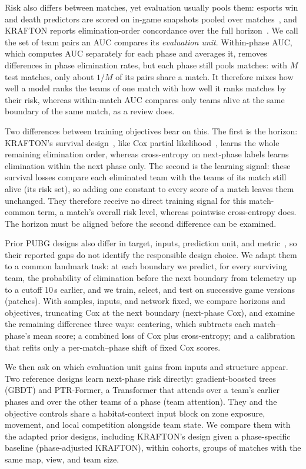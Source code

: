 \documentclass[sigconf,anonymous,nonacm]{acmart}
\begin{document}
Risk also differs between matches, yet evaluation usually pools them: esports win and death predictors are scored on in-game snapshots pooled over matches~\cite{Hodge21,Katona19,Marshall22}, and KRAFTON reports elimination-order concordance over the full horizon~\cite{KRAFTON}. We call the set of team pairs an AUC compares its \emph{evaluation unit}. Within-phase AUC, which computes AUC separately for each phase and averages it, removes differences in phase elimination rates, but each phase still pools matches: with $M$ test matches, only about $1/M$ of its pairs share a match. It therefore mixes how well a model ranks the teams of one match with how well it ranks matches by their risk, whereas within-match AUC compares only teams alive at the same boundary of the same match, as a review does.

Two differences between training objectives bear on this. The first is the horizon: KRAFTON's survival design~\cite{KRAFTON}, like Cox partial likelihood~\cite{Cox72}, learns the whole remaining elimination order, whereas cross-entropy on next-phase labels learns elimination within the next phase only. The second is the learning signal: these survival losses compare each eliminated team with the teams of its match still alive (its risk set), so adding one constant to every score of a match leaves them unchanged. They therefore receive no direct training signal for this match-common term, a match's overall risk level, whereas pointwise cross-entropy does. The horizon must be aligned before the second difference can be examined.

Prior PUBG designs also differ in target, inputs, prediction unit, and metric~\cite{Sagong25a,KRAFTON}, so their reported gaps do not identify the responsible design choice. We adapt them to a common landmark task: at each boundary we predict, for every surviving team, the probability of elimination before the next boundary from telemetry up to a cutoff 10\,s earlier, and we train, select, and test on successive game versions (patches). With samples, inputs, and network fixed, we compare horizons and objectives, truncating Cox at the next boundary (next-phase Cox), and examine the remaining difference three ways: centering, which subtracts each match--phase's mean score; a combined loss of Cox plus cross-entropy; and a calibration that refits only a per-match--phase shift of fixed Cox scores.

We then ask on which evaluation unit gains from inputs and structure appear. Two reference designs learn next-phase risk directly: gradient-boosted trees (GBDT) and PTR-Former, a Transformer that attends over a team's earlier phases and over the other teams of a phase (team attention). They and the objective controls share a habitat-context input block on zone exposure, movement, and local competition alongside team state. We compare them with the adapted prior designs, including KRAFTON's design given a phase-specific baseline (phase-adjusted KRAFTON), within cohorts, groups of matches with the same map, view, and team size.
\end{document}
